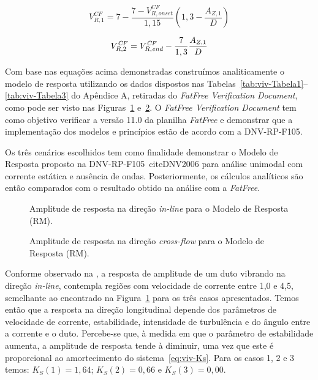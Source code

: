 \begin{equation}
V_{R, 1}^\mathit{CF} = 7 - \frac{7 - V^\mathit{CF}_{R, \mathit{onset}}}{1,15} \left(1,3 - \frac{A_{Z,1}}{D}\right)
\end{equation}

\begin{equation}
V_{R, 2}^\mathit{CF} = V^\mathit{CF}_{R, \mathit{end}} - \frac{7}{1,3} \frac{A_{Z, 1}}{D}\\
\end{equation}

Com base nas equações acima demonstradas construímos analiticamente o modelo de resposta utilizando os dados dispostos nas Tabelas~\ref{tab:viv-Tabela1}--\ref{tab:viv-Tabela3} do Apêndice A, retiradas do \textit{FatFree Verification Document}, como pode ser visto nas Figuras~\ref{fig:viv-Resposta_IL} e~\ref{fig:viv-Resposta_CF}.
O \textit{FatFree Verification Document} tem como objetivo verificar a versão 11.0 da planilha \textit{FatFree} e demonstrar que a implementação dos modelos e princípios estão de acordo com a DNV-RP-F105.

Os três cenários escolhidos tem como finalidade demonstrar o Modelo de Resposta proposto na DNV-RP-F105~cite{DNV2006} para análise unimodal com corrente estática e ausência de ondas.
Posteriormente, os cálculos analíticos são então comparados com o resultado obtido na análise com a \textit{FatFree}.


\begin{figure}[ht!]
\begin{center}
\caption{Amplitude de resposta na direção \textit{in-line} para o Modelo de Resposta (RM).}
\label{fig:viv-Resposta_IL}
\end{center}
\end{figure}

\begin{figure}[ht!]
\begin{center}
\caption{Amplitude de resposta na direção \textit{cross-flow} para o Modelo de Resposta (RM).}
\label{fig:viv-Resposta_CF}
\end{center}
\end{figure}

Conforme observado na , a resposta de amplitude de um duto vibrando na direção \textit{in-line}, contempla regiões com velocidade de corrente entre 1,0 e 4,5, semelhante ao encontrado na Figura~\ref{fig:viv-Resposta_IL} para os três casos apresentados.
Temos então que a resposta na direção longitudinal depende dos parâmetros de velocidade de corrente, estabilidade, intensidade de turbulência e do ângulo entre a corrente e o duto.
Percebe-se que, à medida em que o parâmetro de estabilidade aumenta, a amplitude de resposta tende à diminuir, uma vez que este é proporcional ao amortecimento do sistema~\ref{eq:viv-Ks}.
Para os casos 1, 2 e 3 temos: $K_S(1) = 1,64$; $K_S(2) = 0,66$ e $K_S(3) = 0,00$.

